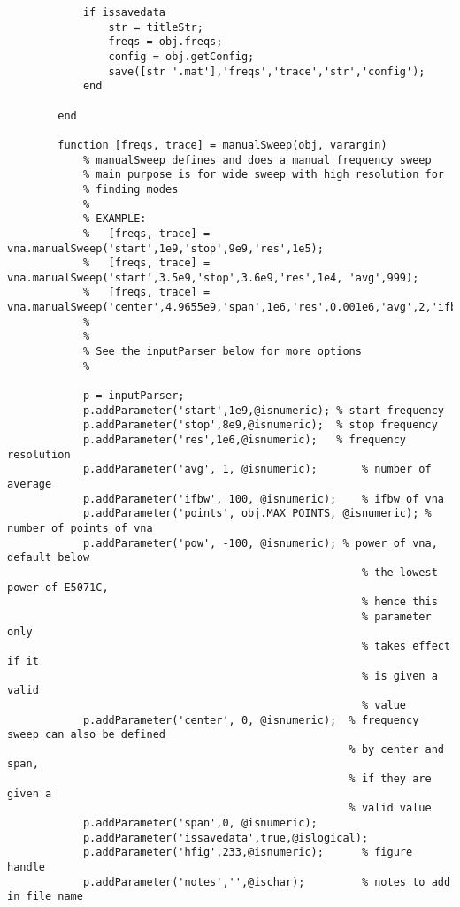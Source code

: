 \begin{lstlisting}
            if issavedata  
                str = titleStr;
                freqs = obj.freqs;
                config = obj.getConfig;
                save([str '.mat'],'freqs','trace','str','config');
            end      
            
        end
        
        function [freqs, trace] = manualSweep(obj, varargin)
            % manualSweep defines and does a manual frequency sweep
            % main purpose is for wide sweep with high resolution for
            % finding modes
            %
            % EXAMPLE:
            %   [freqs, trace] = vna.manualSweep('start',1e9,'stop',9e9,'res',1e5);
            %   [freqs, trace] = vna.manualSweep('start',3.5e9,'stop',3.6e9,'res',1e4, 'avg',999);
            %   [freqs, trace] = vna.manualSweep('center',4.9655e9,'span',1e6,'res',0.001e6,'avg',2,'ifbw',100,'pow',-10);
            %
            %
            % See the inputParser below for more options
            %
            
            p = inputParser;
            p.addParameter('start',1e9,@isnumeric); % start frequency
            p.addParameter('stop',8e9,@isnumeric);  % stop frequency
            p.addParameter('res',1e6,@isnumeric);   % frequency resolution
            p.addParameter('avg', 1, @isnumeric);       % number of average
            p.addParameter('ifbw', 100, @isnumeric);    % ifbw of vna
            p.addParameter('points', obj.MAX_POINTS, @isnumeric); % number of points of vna
            p.addParameter('pow', -100, @isnumeric); % power of vna, default below
                                                        % the lowest power of E5071C,
                                                        % hence this
                                                        % parameter only
                                                        % takes effect if it
                                                        % is given a valid
                                                        % value
            p.addParameter('center', 0, @isnumeric);  % frequency sweep can also be defined
                                                      % by center and span,
                                                      % if they are given a
                                                      % valid value
            p.addParameter('span',0, @isnumeric);
            p.addParameter('issavedata',true,@islogical);
            p.addParameter('hfig',233,@isnumeric);      % figure handle
            p.addParameter('notes','',@ischar);         % notes to add in file name
            

\end{lstlisting}
